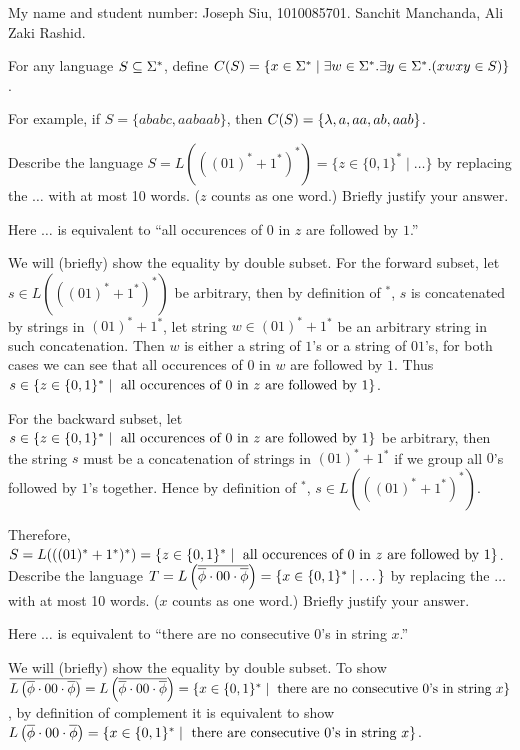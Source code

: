 \documentclass[11pt, sakura, night, 1in]{LatexTemplate/hw}
\begin{document}
My name and student number: Joseph Siu, 1010085701. Sanchit Manchanda, Ali Zaki Rashid.

For any language $S\subseteq \Sigma^*$, define $C(S)=\{x\in\Sigma^*\mid \exists w\in\Sigma^*. \exists y\in\Sigma^*.(xwxy\in S)\}$.

For example, if $S=\{ababc,aabaab\}$, then $C(S)=\{\lambda,a,aa,ab,aab\}$.

 Describe the language $S=L(((01)^*+1^*)^*)=\{z\in\{0,1\}^*\mid \dots\}$ by replacing the $\dots$ with at most 10 words. ($z$ counts as one word.) Briefly justify your answer.

Here $\dots$ is equivalent to ``all occurences of $0$ in $z$ are followed by $1$.''

 We will (briefly) show the equality by double subset. For the forward subset, let $s\in L(((01)^*+1^*)^*)$ be arbitrary, then by definition of $^*$, $s$ is concatenated by strings in $(01)^*+1^*$, let string $w\in (01)^*+1^*$ be an arbitrary string in such concatenation. Then $w$ is either a string of $1$'s or a string of $01$'s, for both cases we can see that all occurences of $0$ in $w$ are followed by $1$. Thus $s\in \{z\in\{0,1\}^*\mid \text{ all occurences of $0$ in $z$ are followed by $1$}\}$. 

For the backward subset, let $s\in \{z\in\{0,1\}^*\mid \text{ all occurences of $0$ in $z$ are followed by $1$}\}$ be arbitrary, then the string $s$ must be a concatenation of strings in $(01)^*+1^*$ if we group all $0$'s followed by $1$'s together. Hence by definition of $^*$, $s\in L(((01)^*+1^*)^*)$.

Therefore, $S=L(((01)^*+1^*)^*)=\{z\in\{0,1\}^*\mid \text{ all occurences of $0$ in $z$ are followed by $1$}\}$.\\

 Describe the language $T=L\left(\overline{\overline{\phi}\cdot00\cdot\overline{\phi}}\right)=\{x\in\{0,1\}^*\mid \dots\}$ by replacing the $\dots$ with at most 10 words. ($x$ counts as one word.) Briefly justify your answer.

Here $\dots$ is equivalent to ``there are no consecutive $0$'s in string $x$.''

 We will (briefly) show the equality by double subset. To show $\overline{L\left(\overline{\phi}\cdot00\cdot\overline{\phi}\right)}=L\left(\overline{\overline{\phi}\cdot00\cdot\overline{\phi}}\right)=\{x\in\{0,1\}^*\mid \text{ there are no consecutive $0$'s in string $x$}\}$, by definition of complement it is equivalent to show $L\left(\overline{\phi}\cdot00\cdot\overline{\phi}\right)=\{x\in\{0,1\}^*\mid \text{ there are consecutive $0$'s in string $x$}\}$.
\end{document}

